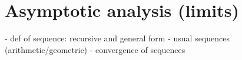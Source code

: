 \section{Asymptotic analysis (limits)}
- def of sequence: recursive and general form
- usual sequences (arithmetic/geometric)
- convergence of sequences
